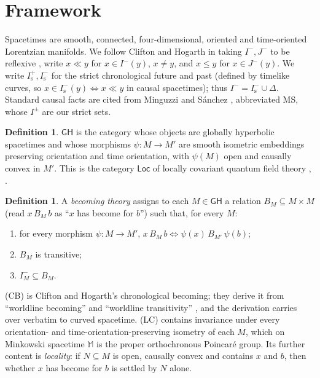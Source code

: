 \documentclass[11pt]{article}
\theoremstyle{definition}
\newtheorem{definition}[theorem]{Definition}
\newcommand{\GH}{\mathsf{GH}}
\newcommand{\Mink}{\mathbb M}
\newcommand{\Ifut}{I^{+}}
\newcommand{\Ichr}{I^{-}}
\newcommand{\Jm}{J^{-}}
\begin{document}
\section{Framework}\label{sec:framework}

Spacetimes are smooth, connected, four-dimensional, oriented and
time-oriented Lorentzian manifolds. We follow Clifton and Hogarth in taking
$\Ichr,\Jm$ to be reflexive \citep[p.~360]{CH1995}, write $x\ll y$ for
$x\in\Ichr(y)$, $x\neq y$, and $x\le y$ for $x\in\Jm(y)$. We write
$\Ifut_{\mathrm s},\Ichr_{\mathrm s}$ for the strict chronological future and
past (defined by timelike curves, so $x\in\Ichr_{\mathrm s}(y)\iff x\ll y$ in
causal spacetimes); thus $\Ichr=\Ichr_{\mathrm s}\cup\Delta$. Standard causal facts
are cited from Minguzzi and Sánchez \citep{MS2008}, abbreviated MS, whose
$I^\pm$ are our strict sets.

\begin{definition}
$\GH$ is the category whose objects are globally hyperbolic spacetimes and
whose morphisms $\psi:M\to M'$ are smooth isometric embeddings preserving
orientation and time orientation, with $\psi(M)$ open and causally convex in
$M'$. This is the category $\mathsf{Loc}$ of locally covariant quantum field
theory \citep[\S2]{BFV2003}, \citep[\S2.2]{FV2012}.
\end{definition}

\begin{definition}
A \emph{becoming theory} assigns to each $M\in\GH$ a relation
$B_M\subseteq M\times M$ (read $x\,B_M\,b$ as ``$x$ has become for $b$'') such
that, for every $M$:
\begin{enumerate}
\item[(LC)] for every morphism $\psi:M\to M'$, $x\,B_M\,b\iff
\psi(x)\,B_{M'}\,\psi(b)$;
\item[(T)] $B_M$ is transitive;
\item[(CB)] $\Ichr_M\subseteq B_M$.
\end{enumerate}
\end{definition}

(CB) is Clifton and Hogarth's chronological becoming; they derive it from
``worldline becoming'' and ``worldline transitivity'' \citep[Lemma,
p.~364]{CH1995}, and the derivation carries over verbatim to curved
spacetime. (LC) contains invariance under every orientation- and
time-orientation-preserving isometry of each $M$, which on Minkowski spacetime
$\Mink$ is the proper orthochronous Poincaré group. Its further content is
\emph{locality}: if $N\subseteq M$ is open, causally convex and contains $x$
and $b$, then whether $x$ has become for $b$ is settled by $N$ alone.
\end{document}
